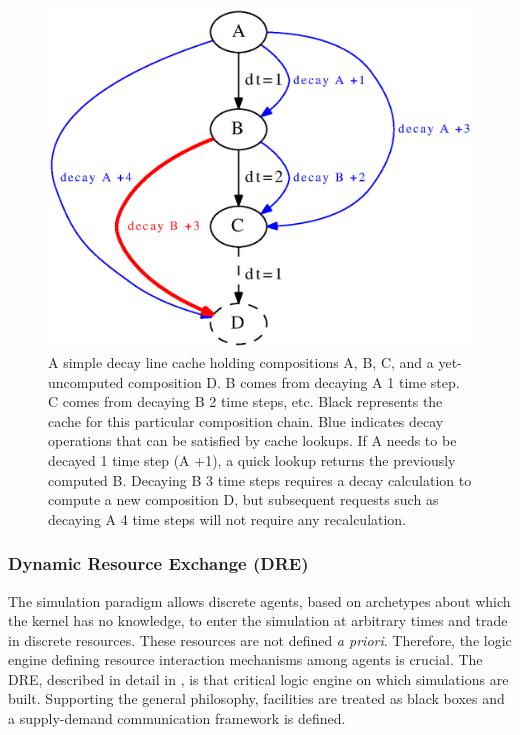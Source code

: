 \begin{figure}[htbp!]
\begin{center}
\includegraphics[width=\textwidth]{./images/compositions}
\end{center}
\caption{
A simple decay line cache holding compositions A, B, C, and a
yet-uncomputed composition D.  B comes from decaying A 1 time step.  C comes
from decaying B 2 time steps, etc.  Black represents the cache for this
particular composition chain. Blue indicates decay operations that can be
satisfied by cache lookups.   If A needs to be decayed 1 time step (A +1), a
quick lookup returns the previously computed B.  Decaying B 3 time steps
requires a decay calculation to compute a new composition D, but subsequent
requests such as decaying A 4 time steps will not require any recalculation.
}
\label{fig:compositions}
\end{figure}


\subsubsection{Dynamic Resource Exchange (DRE)}

The \Cyclus simulation paradigm allows discrete agents, based on archetypes
about which the kernel has no knowledge, to enter the simulation at arbitrary
times and trade in discrete resources. These resources are not defined \textit{a
  priori}. Therefore, the logic engine defining resource interaction mechanisms
among agents is crucial. The \gls{DRE}, described in detail in
\cite{gidden_agent-based_2015}, is that critical logic engine on which \Cyclus
simulations are built.  Supporting the general \Cyclus philosophy, facilities
are treated as black boxes and a supply-demand communication framework is
defined.

